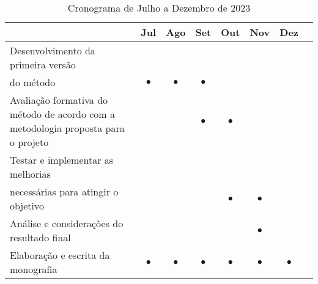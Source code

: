 \begin{table}[ht]
        \centering
        \begin{tabular}{ p{7.8cm} c c c c c c c }
                \toprule
                 & Jul       & Ago       & Set       & Out       & Nov       & Dez       & \\
                \midrule
                Desenvolvimento da primeira versão                                         \\ do método
                 & $\bullet$ & $\bullet$ & $\bullet$ &           &           &           & \\
                \midrule
                Avaliação formativa do método de acordo com a metodologia proposta para o projeto
                 &           &           & $\bullet$ & $\bullet$ &           &           & \\
                \midrule
                Testar e implementar as melhorias                                          \\ necessárias para atingir o objetivo
                 &           &           &           & $\bullet$ & $\bullet$ &           & \\
                \midrule
                Análise e considerações do resultado final
                 &           &           &           &           & $\bullet$ &           & \\
                \midrule
                Elaboração e escrita da monografia
                 & $\bullet$ & $\bullet$ & $\bullet$ & $\bullet$ & $\bullet$ & $\bullet$ & \\
                \midrule
                \bottomrule
        \end{tabular}
        \caption{Cronograma de Julho a Dezembro de 2023}~\label{tab:cronograma_tcc_ii}
\end{table}